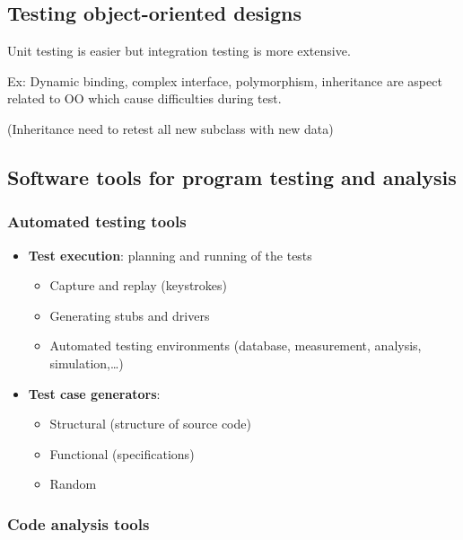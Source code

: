 \subsection{Testing object-oriented designs}
Unit testing is easier but integration testing is more extensive. \newline

Ex: Dynamic binding, complex interface, polymorphism, inheritance are aspect related to OO which cause difficulties during test.

(Inheritance need to retest all new subclass with new data)

\subsection{Software tools for program testing and analysis}

\subsubsection{Automated testing tools}

\begin{itemize}
\item \textbf{Test execution}: planning and running of the tests
\begin{itemize}
    \item Capture and replay (keystrokes)
    \item Generating stubs and drivers
    \item Automated testing environments (database, measurement, analysis, simulation,\ldots)
\end{itemize}

\item \textbf{Test case generators}:
\begin{itemize}
    \item Structural (structure of source code)
    \item Functional (specifications)
    \item Random
\end{itemize}
\end{itemize}

\subsubsection{Code analysis tools}


